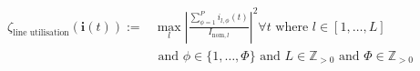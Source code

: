 \begin{equation}
\begin{split}
	\zeta_\text{line utilisation}(\textbf{i}(t)) :=& %
	\max_{l}{\left|\frac{\sum_{\phi=1}^{P}{i_{l,\phi}(t)}}{I_{\text{nom},l}}\right|^2} \forall t \text{ where } l \in [1, \dots, L] \\
	&\text{ and } \phi \in \{1, \dots, \Phi\} \text{ and } L \in \mathbb{Z}_{>0} \text{ and } \Phi \in \mathbb{Z}_{>0}
\end{split}
\label{ch1:equ:line-utilisation}
\end{equation}